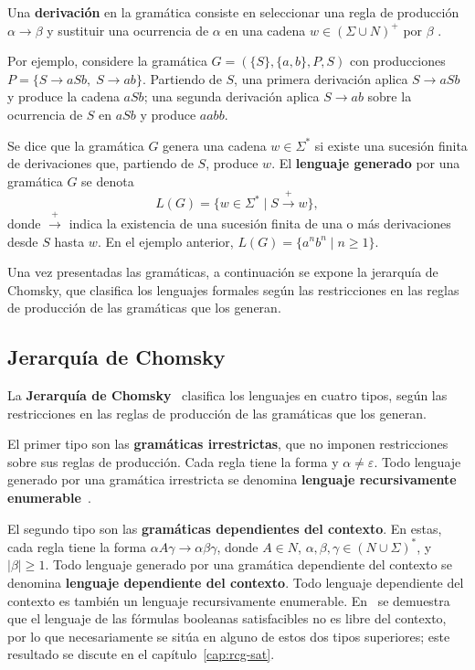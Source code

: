 \documentclass{article}
\theoremstyle{definition}
\theoremstyle{plain}
\theoremstyle{remark}
\begin{document}
Una \textbf{derivación} en la gramática consiste en seleccionar una
regla de producción $\alpha \to \beta$ y sustituir una ocurrencia de
$\alpha$ en una cadena $w \in (\Sigma \cup N)^+$ por $\beta$
\cite{hopcroft2006introduction}.

Por ejemplo, considere la gramática $G = (\{S\}, \{a, b\}, P, S)$ con
producciones $P = \{S \to aSb,\; S \to ab\}$. Partiendo de $S$, una
primera derivación aplica $S \to aSb$ y produce la cadena $aSb$; una
segunda derivación aplica $S \to ab$ sobre la ocurrencia de $S$ en
$aSb$ y produce $aabb$.

Se dice que la gramática $G$ genera una cadena $w \in \Sigma^*$ si
existe una sucesión finita de derivaciones que, partiendo de $S$,
produce $w$. El \textbf{lenguaje generado} por una gramática $G$ se
denota
\[
  L(G) = \{ w \in \Sigma^* \mid S \xrightarrow{+} w \},
\]
donde $\xrightarrow{+}$ indica la existencia de una sucesión finita
de una o más derivaciones desde $S$ hasta $w$. En el ejemplo anterior,
$L(G) = \{a^n b^n \mid n \ge 1\}$.

Una vez presentadas las gramáticas, a continuación se expone la
jerarquía de Chomsky, que clasifica los lenguajes formales según las
restricciones en las reglas de producción de las gramáticas que los
generan.

\subsection{Jerarquía de Chomsky}

La \textbf{Jerarquía de Chomsky}~\cite{hunter2020chomsky} clasifica los
lenguajes en cuatro tipos, según las restricciones en las reglas de
producción de las gramáticas que los generan.

El primer tipo son las \textbf{gramáticas irrestrictas}, que no imponen
restricciones sobre sus reglas de producción. Cada regla tiene la forma
 y
$\alpha \neq \varepsilon$. Todo lenguaje generado por una gramática
irrestricta se denomina \textbf{lenguaje recursivamente
  enumerable}~\cite{hopcroft2006introduction}.

El segundo tipo son las \textbf{gramáticas dependientes del contexto}.
En estas, cada regla tiene la forma $\alpha A \gamma \to \alpha \beta \gamma$,
donde $A \in N$, $\alpha, \beta, \gamma \in (N \cup \Sigma)^*$, y
$|\beta| \ge 1$. Todo lenguaje generado por una gramática dependiente
del contexto se denomina \textbf{lenguaje dependiente del contexto}.
Todo lenguaje dependiente del contexto es también un lenguaje
recursivamente enumerable. En~\cite{gomezmolina2025} se demuestra que
el lenguaje de las fórmulas booleanas satisfacibles no es libre del
contexto, por lo que necesariamente se sitúa en alguno de estos dos
tipos superiores; este resultado se discute en el
capítulo~\ref{cap:rcg-sat}.
\end{document}
